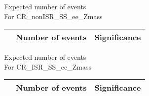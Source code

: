 \begin{frame}{Expected number of events \\ For CR\_nonISR\_SS\_ee\_Zmass}
\vspace{5mm}
\begin{tabular}{|c|c|c|}
\hline
& Number of events & Significance \\
\hline

\end{tabular}
\end{frame}

\begin{frame}{Expected number of events \\ For CR\_ISR\_SS\_ee\_Zmass}
\vspace{5mm}
\begin{tabular}{|c|c|c|}
\hline
& Number of events & Significance \\
\hline

\end{tabular}
\end{frame}

